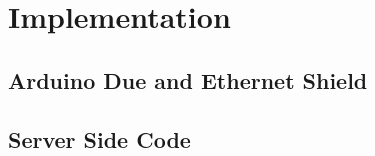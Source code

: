 
\chapter{Implementation}
\label{imple}



\section{Arduino Due and Ethernet Shield}

\section{Server Side Code}

